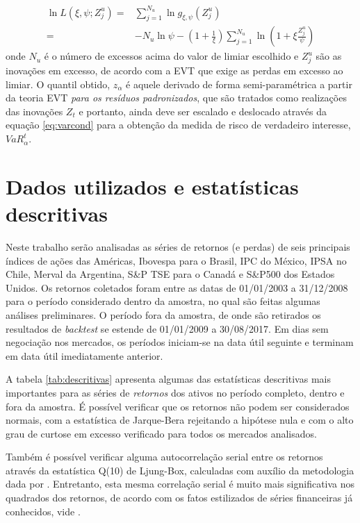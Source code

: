 \documentclass[review]{elsarticle}
\theoremstyle{definition}
\begin{document}
\begin{align}
\label{eq:gpdloglik}
\ln L(\xi, \psi; Z^u_j)=&\sum\limits_{j=1}^{N_u}\ln g_{\xi, \psi}(Z^u_j)\nonumber\\
					   =&-N_u \ln \psi-\left(1+\frac{1}{\xi}\right)\sum\limits_{j=1}^{N_u}\ln \left(1+\xi\frac{Z^u_j}{\psi}\right) 
\end{align}
onde $N_u$ é o número de excessos acima do valor de limiar escolhido e $Z^u_j$ são as inovações em excesso, de acordo com a EVT que exige as perdas em excesso ao limiar. O quantil obtido, $z_\alpha$ é aquele derivado de forma semi-paramétrica a partir da teoria EVT \emph{para os resíduos padronizados}, que são tratados como realizações das inovações $Z_t$ e portanto, ainda deve ser escalado e deslocado através da equação \eqref{eq:varcond} para a obtenção da medida de risco de verdadeiro interesse, $VaR_\alpha^t$.

\section{Dados utilizados e estatísticas descritivas}
\label{sec:descritivas}

Neste trabalho serão analisadas as séries de retornos (e perdas) de seis principais índices de ações das Américas, Ibovespa para o Brasil, IPC do México, IPSA no Chile, Merval da Argentina, S\&P TSE para o Canadá e S\&P500 dos Estados Unidos. Os retornos coletados foram entre as datas de 01/01/2003 a 31/12/2008 para o período considerado dentro da amostra, no qual são feitas algumas análises preliminares. O período fora da amostra, de onde são retirados os resultados de \emph{backtest} se estende de 01/01/2009 a 30/08/2017. Em dias sem negociação nos mercados, os períodos iniciam-se na data útil seguinte e terminam em data útil imediatamente anterior.

A tabela \ref{tab:descritivas} apresenta algumas das estatísticas descritivas mais importantes para as séries de \emph{retornos} dos ativos no período completo, dentro e fora da amostra. É possível verificar que os retornos não podem ser considerados normais, com a estatística de Jarque-Bera rejeitando a hipótese nula e com o alto grau de curtose em excesso verificado para todos os mercados analisados.

Também é possível verificar alguma autocorrelação serial entre os retornos através da estatística Q(10) de Ljung-Box, calculadas com auxílio da metodologia dada por \cite{Fisher2012}. Entretanto, esta mesma correlação serial é muito mais significativa nos quadrados dos retornos, de acordo com os fatos estilizados de séries financeiras já conhecidos, vide \cite{Cont2001}.
\end{document}
